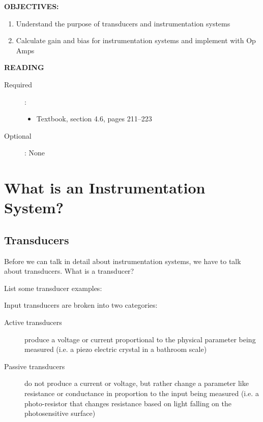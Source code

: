 \documentclass{handout}
\begin{document}
\maketitle

\textbf{OBJECTIVES:}
\begin{enumerate}
\item Understand the purpose of transducers and instrumentation systems
\item Calculate gain and bias for instrumentation systems and implement with Op Amps
\end{enumerate}

\textbf{READING}
\begin{description}
\item [Required]:
\begin{itemize}
\item  Textbook, section 4.6, pages 211--223
\end{itemize}
\item [Optional]: None
\end{description}

\section{What is an Instrumentation System?}
\subsection{Transducers}
Before we can talk in detail about instrumentation systems, we have to talk about transducers.  What is a transducer?


List some transducer examples:


Input transducers are broken into two categories:
\begin{description}
\item[Active transducers] produce a voltage or current proportional to the physical parameter being measured (i.e. a piezo electric crystal in a bathroom scale)
\item[Passive transducers] do not produce a current or voltage, but rather change a parameter like resistance or conductance in proportion to the input being measured (i.e. a photo-resistor that changes resistance based on light falling on the photosensitive surface)
\end{description}
\end{document}
